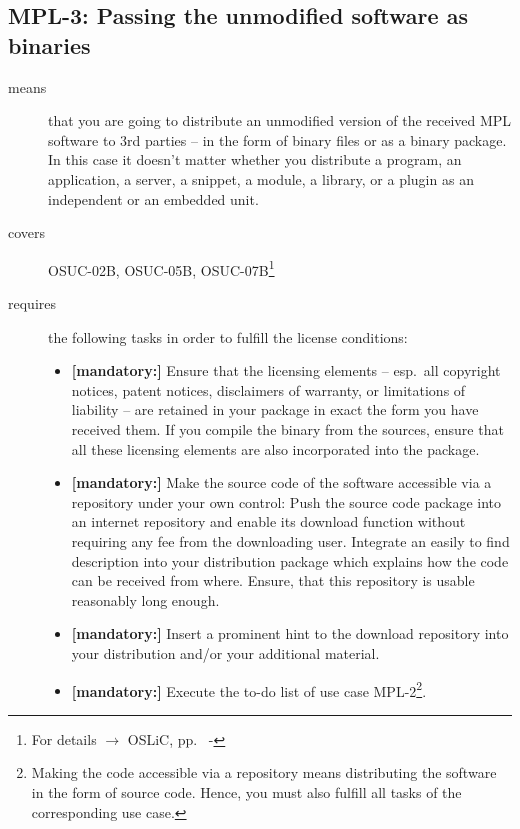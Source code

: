 \subsection{MPL-3: Passing the unmodified software as binaries} 
\label{OSUC-02B-MPL} \label{OSUC-05B-MPL} \label{OSUC-07B-MPL}

\begin{description}
\item[means] that you are going to distribute an unmodified version of the
received MPL software to 3rd parties -- in the form of binary files or as a
bi\-na\-ry package. In this case it doesn't matter whether you distribute a
program, an application, a server, a snippet, a module, a library, or a plugin
as an independent or an embedded unit.

\item[covers] OSUC-02B, OSUC-05B, OSUC-07B\footnote{For details $\rightarrow$
OSLiC, pp.\ \pageref{OSUC-02B-DEF} - \pageref{OSUC-07B-DEF}}

\item[requires] the following tasks in order to fulfill the license conditions:
\begin{itemize}
  
  \item \textbf{[mandatory:]} Ensure that the licensing elements -- esp.\ all
  copyright notices, patent notices, disclaimers of warranty, or limitations of
  liability -- are retained in your package in exact the form you have received
  them. If you compile the binary from the sources, ensure that all these
  licensing elements are also incorporated into the package.
  
  \item \textbf{[mandatory:]} Make the source code of the software accessible
  via a repository under your own control: Push the source code package into an
  internet repository and enable its download function without requiring any fee
  from the downloading user. Integrate an easily to find description into your
  distribution package which explains how the code can be received from where.
  Ensure, that this repository is usable reasonably long enough.
  
  \item \textbf{[mandatory:]} Insert a prominent hint to the download repository
  into your distribution and/or your additional material.
  
  \item \textbf{[mandatory:]} Execute the to-do list of use case MPL-2\footnote{
  Making the code accessible via a repository means distributing the software in
  the form of source code. Hence, you must also fulfill all tasks of the
  corresponding use case.}.
  

\end{itemize}
\end{description}
